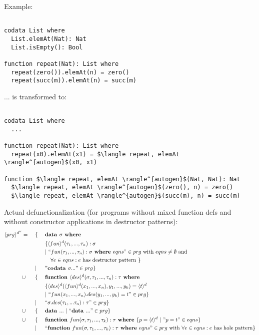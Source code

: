 \documentclass[11pt]{article} %
\begin{document}
Example:

\begin{lstlisting}

codata List where
  List.elemAt(Nat): Nat
  List.isEmpty(): Bool

function repeat(Nat): List where
  repeat(zero()).elemAt(n) = zero()
  repeat(succ(m)).elemAt(n) = succ(m)

\end{lstlisting}

... is transformed to:

\begin{lstlisting}[mathescape]

codata List where
  ...

function repeat(Nat): List where
  repeat(x0).elemAt(x1) = $\langle repeat, elemAt \rangle^{autogen}$(x0, x1)

function $\langle repeat, elemAt \rangle^{autogen}$(Nat, Nat): Nat
  $\langle repeat, elemAt \rangle^{autogen}$(zero(), n) = zero()
  $\langle repeat, elemAt \rangle^{autogen}$(succ(m), n) = succ(m)

\end{lstlisting}

Actual defunctionalization (for programs without mixed function defs and without constructor applications in destructor patterns):
\begin{alignat*}{3}
\langle prg \rangle^{d''} & = ~&& \{ ~&& \textrm{\textbf{data }} \sigma \textrm{\textbf{ where }} \\
& && && \{ \langle fun \rangle^d (\tau_1, ..., \tau_n): \sigma \\
& && && | ~ `` fun (\tau_1, ..., \tau_n): \sigma \textrm{\textbf{ where }} eqns " \in prg \textrm{ with } eqns \neq \emptyset \textrm{ and } \\
& && &&\quad \forall e \in eqns: e \textrm{ has destructor pattern }  \} \\
& && | && "\textrm{\textbf{codata }} \sigma ..." \in prg \} \\
& \cup && \{ && \textrm{\textbf{function }} \langle des \rangle^d (\sigma, \tau_1, ..., \tau_n): \tau \textrm{\textbf{ where }} \\
& && && \{ \langle des \rangle^d ( \langle fun \rangle^d (x_1, ..., x_n), y_1, ..., y_k) = \langle t \rangle^d \\
& && && | ~ `` fun(x_1, ..., x_n).des(y_1, ..., y_k) = t " \in prg \} \\
& && | && `` \sigma.des(\tau_1, ... \tau_n): \tau " \in prg \} \\
& \cup && \{ && \textrm{\textbf{data }} ... ~ | ~ `` \textrm{\textbf{data }} ... " \in prg \} \\
& \cup && \{ && \textrm{\textbf{function }} fun(\sigma, \tau_1, ..., \tau_k): \tau \textrm{\textbf{ where }} \{ p = \langle t \rangle^d ~ | ~ "p = t" \in eqns \} \\
& && | && `` \textrm{\textbf{function }} fun(\sigma, \tau_1, ..., \tau_k): \tau \textrm{\textbf{ where }} eqns " \in prg \textrm{ with } \forall e \in eqns: e \textrm{ has hole pattern}\} 
\end{alignat*}
\end{document}

